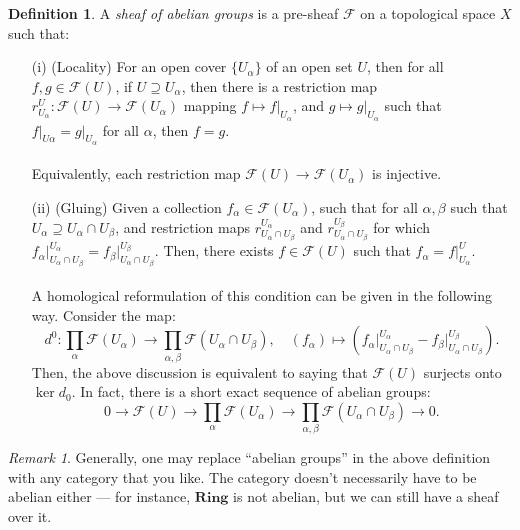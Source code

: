 \documentclass[a4paper]{report}
\theoremstyle{definition}
\newtheorem{definition}{Definition}
\theoremstyle{remark}
\newtheorem{remark}{Remark}
\theoremstyle{proposition}
\theoremstyle{conjecture}
\theoremstyle{lemma}
\theoremstyle{corollary}
\theoremstyle{exercise}
\theoremstyle{example}
\newcommand{\mcal}{\mathcal}
\begin{document}
 \begin{definition}
    A \emph{sheaf of abelian groups} is a pre-sheaf $\mcal{F}$ on a topological
    space $X$ such that:
    \begin{itemize}
        \item[(i)] (Locality) For an open cover $\lbrace U_\alpha\rbrace$ 
            of an open set $U$, then for all $f,g \in \mcal{F}(U)$,
            if $U\supseteq U_\alpha$, then there is a restriction map
            $r_{U_\alpha}^U : \mcal{F}(U) \to \mcal{F}(U_\alpha)$ mapping
            $f \mapsto f\vert_{U_\alpha}$, and $g \mapsto g\vert_{U_\alpha}$ 
            such that $f\vert_{U\alpha}=g\vert_{U_\alpha}$
            for all $\alpha$, then $f=g$.\\\\
            Equivalently, each restriction map 
            $\mcal{F}(U)\to\mcal{F}(U_\alpha)$ is injective.
        \item[(ii)] (Gluing) Given a collection $f_\alpha \in \mcal{F}(U_\alpha)$, 
            such that for all $\alpha,\beta$ such that $U_\alpha \supseteq U_\alpha \cap U_\beta$, 
            and restriction maps $r_{U_\alpha\cap U_\beta}^{U_\alpha}$ and $r_{U_\alpha \cap U_\beta}^{U_\beta}$ for which 
            $f_\alpha\vert_{U_\alpha \cap U_\beta}^{U_\alpha} = f_\beta\vert_{U_\alpha\cap U_\beta}^{U_\beta}$. Then, there exists $f\in \mcal{F}(U)$ such that
            $f_\alpha = f\vert_{U_\alpha}^U$.\\\\
            A homological reformulation of this condition can be given in the 
            following way. Consider the map:
            $$d^0 :\prod_\alpha \mcal{F}(U_\alpha) \longrightarrow \prod_{\alpha,\beta} \mcal{F}(U_\alpha\cap U_\beta), \quad (f_\alpha)\longmapsto (f_\alpha\vert_{U_\alpha\cap U_\beta}^{U_\alpha} - f_\beta\vert_{U_\alpha\cap U_\beta}^{U_\beta}).$$
            Then, the above discussion is equivalent to saying that 
            $\mcal{F}(U)$ surjects onto $\ker d_0$. 
            In fact, there is a short exact sequence of abelian groups:
            $$0 \longrightarrow \mcal{F}(U) \longrightarrow \prod_\alpha\mcal{F}(U_\alpha) \longrightarrow \prod_{\alpha,\beta}\mcal{F}(U_\alpha\cap U_\beta)\longrightarrow 0.$$
    \end{itemize}
 \end{definition}

 \begin{remark}
    Generally, one may replace ``abelian groups'' in the above definition
    with any category that you like. The category doesn't necessarily have
    to be abelian either --- for instance, $\mathbf{Ring}$ is not abelian,
    but we can still have a sheaf over it.
 \end{remark}
\end{document}
